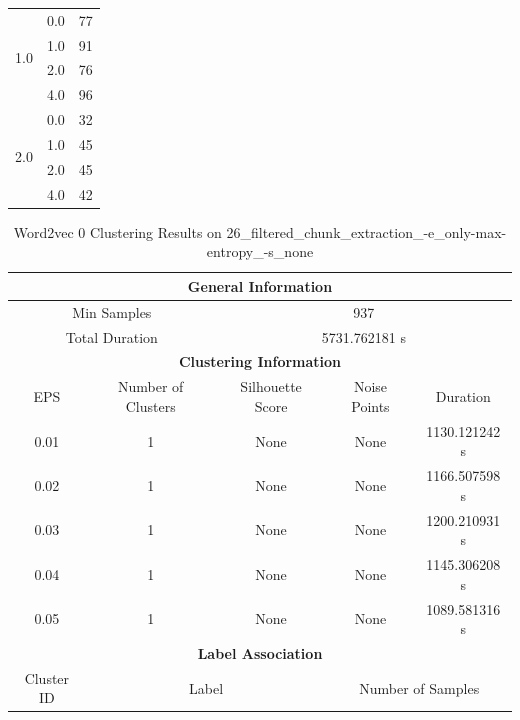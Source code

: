 \begin{longtable}{|c|c|c|c|c|}
\hline
\multirow{4}{*}{1.0} & \multicolumn{2}{c|}{0.0} & \multicolumn{2}{c|}{77} \\
& \multicolumn{2}{c|}{1.0} & \multicolumn{2}{c|}{91} \\
& \multicolumn{2}{c|}{2.0} & \multicolumn{2}{c|}{76} \\
& \multicolumn{2}{c|}{4.0} & \multicolumn{2}{c|}{96} \\
\hline
\multirow{4}{*}{2.0} & \multicolumn{2}{c|}{0.0} & \multicolumn{2}{c|}{32} \\
& \multicolumn{2}{c|}{1.0} & \multicolumn{2}{c|}{45} \\
& \multicolumn{2}{c|}{2.0} & \multicolumn{2}{c|}{45} \\
& \multicolumn{2}{c|}{4.0} & \multicolumn{2}{c|}{42} \\
\hline
\end{longtable}


\begin{longtable}{|c|c|c|c|c|}
\caption{Word2vec 0 Clustering Results on 26\_filtered\_chunk\_extraction\_-e\_only-max-entropy\_-s\_none} \label{tab:26_filtered_chunk_extraction_-e_only-max-entropy_-s_none_word2vec_0_clustering_results}\\
\hline
\multicolumn{5}{|c|}{\textbf{General Information}} \\
\hline
\multicolumn{2}{|c|}{Min Samples} & \multicolumn{3}{c|}{937} \\
\multicolumn{2}{|c|}{Total Duration} & \multicolumn{3}{c|}{5731.762181 s} \\
\hline
\multicolumn{5}{|c|}{\textbf{Clustering Information}} \\
\hline
EPS & Number of Clusters & Silhouette Score & Noise Points & Duration \\
0.01 & 1 & None & None & 1130.121242 s\\
0.02 & 1 & None & None & 1166.507598 s\\
0.03 & 1 & None & None & 1200.210931 s\\
0.04 & 1 & None & None & 1145.306208 s\\
0.05 & 1 & None & None & 1089.581316 s\\
\hline
\multicolumn{5}{|c|}{\textbf{Label Association}} \\
\hline
Cluster ID & \multicolumn{2}{c|}{Label} & \multicolumn{2}{c|}{Number of Samples} \\
\hline
\end{longtable}


